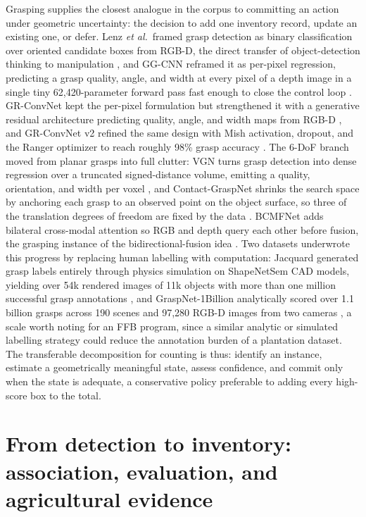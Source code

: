 Grasping supplies the closest analogue in the corpus to committing an action under geometric uncertainty: the decision to add one inventory record, update an existing one, or defer. Lenz \textit{et al.}\ framed grasp detection as binary classification over oriented candidate boxes from RGB-D, the direct transfer of object-detection thinking to manipulation \cite{lenz2015grasp}, and GG-CNN reframed it as per-pixel regression, predicting a grasp quality, angle, and width at every pixel of a depth image in a single tiny 62{,}420-parameter forward pass fast enough to close the control loop \cite{morrison2018ggcnn}. GR-ConvNet kept the per-pixel formulation but strengthened it with a generative residual architecture predicting quality, angle, and width maps from RGB-D \cite{kumra2020grconvnet}, and GR-ConvNet v2 refined the same design with Mish activation, dropout, and the Ranger optimizer to reach roughly 98\% grasp accuracy \cite{kumra2022grconvnetv2}. The 6-DoF branch moved from planar grasps into full clutter: VGN turns grasp detection into dense regression over a truncated signed-distance volume, emitting a quality, orientation, and width per voxel \cite{breyer2021vgn}, and Contact-GraspNet shrinks the search space by anchoring each grasp to an observed point on the object surface, so three of the translation degrees of freedom are fixed by the data \cite{sundermeyer2021contactgraspnet}. BCMFNet adds bilateral cross-modal attention so RGB and depth query each other before fusion, the grasping instance of the bidirectional-fusion idea \cite{zhang2023bcmfnet}. Two datasets underwrote this progress by replacing human labelling with computation: Jacquard generated grasp labels entirely through physics simulation on ShapeNetSem CAD models, yielding over 54k rendered images of 11k objects with more than one million successful grasp annotations \cite{depierre2018jacquard}, and GraspNet-1Billion analytically scored over 1.1 billion grasps across 190 scenes and 97{,}280 RGB-D images from two cameras \cite{fang2020graspnet}, a scale worth noting for an FFB program, since a similar analytic or simulated labelling strategy could reduce the annotation burden of a plantation dataset. The transferable decomposition for counting is thus: identify an instance, estimate a geometrically meaningful state, assess confidence, and commit only when the state is adequate, a conservative policy preferable to adding every high-score box to the total.

\section{From detection to inventory: association, evaluation, and agricultural evidence}

